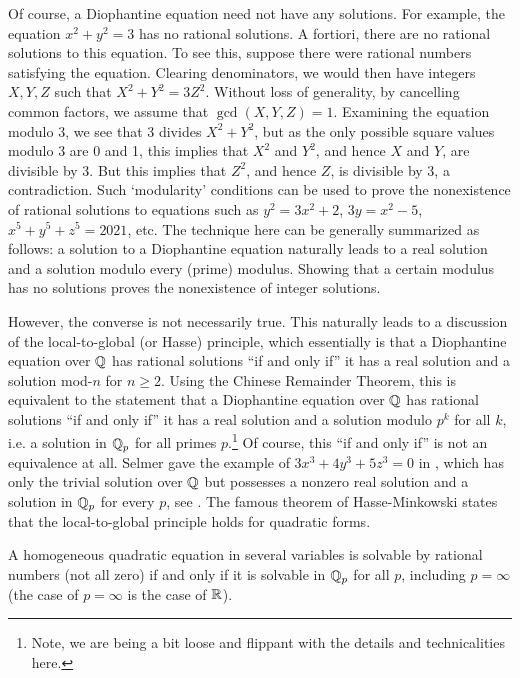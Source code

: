 Of course, a Diophantine equation need not have any solutions. For example, the equation $x^2 + y^2= 3$ has no rational solutions. A fortiori, there are no rational solutions to this equation. To see this, suppose there were rational numbers satisfying the equation. Clearing denominators, we would then have integers $X,Y,Z$ such that $X^2 + Y^2= 3Z^2$. Without loss of generality, by cancelling common factors, we assume that $\gcd(X,Y,Z)= 1$. Examining the equation modulo 3, we see that 3 divides $X^2 + Y^2$, but as the only possible square values modulo 3 are 0 and 1, this implies that $X^2$ and $Y^2$, and hence $X$ and $Y$, are divisible by 3. But this implies that $Z^2$, and hence $Z$, is divisible by 3, a contradiction. Such `modularity' conditions can be used to prove the nonexistence of rational solutions to equations such as $y^2= 3x^2 + 2$, $3y= x^2 - 5$, $x^5 + y^5 + z^5= 2021$, etc. The technique here can be generally summarized as follows: a solution to a Diophantine equation naturally leads to a real solution and a solution modulo every (prime) modulus. Showing that a certain modulus has no solutions proves the nonexistence of integer solutions. 


However, the converse is not necessarily true. This naturally leads to a discussion of the local-to-global (or Hasse) principle, which essentially is that a Diophantine equation over $\mathbb{Q}$ has rational solutions ``if and only if'' it has a real solution and a solution mod-$n$ for $n \geq 2$. Using the Chinese Remainder Theorem, this is equivalent to the statement that a Diophantine equation over $\mathbb{Q}$ has rational solutions ``if and only if'' it has a real solution and a solution modulo $p^k$ for all $k$, i.e. a solution in $\mathbb{Q}_p$ for all primes $p$.\footnote{Note, we are being a bit loose and flippant with the details and technicalities here.} Of course, this ``if and only if'' is not an equivalence at all. Selmer gave the example of $3x^3 + 4y^3 + 5z^3= 0$ in \cite{selmer51}, which has only the trivial solution over $\mathbb{Q}$ but possesses a nonzero real solution and a solution in $\mathbb{Q}_p$ for every $p$, see \cite{conradselmer}. The famous theorem of Hasse-Minkowski states that the local-to-global principle holds for quadratic forms. 


\begin{thm}
A homogeneous quadratic equation in several variables is solvable by rational numbers (not all zero) if and only if it is solvable in $\mathbb{Q}_p$ for all $p$, including $p= \infty$ (the case of $p= \infty$ is the case of $\mathbb{R}$). 
\end{thm}


